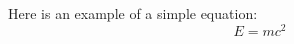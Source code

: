 \documentclass{article}
\begin{document}
Here is an example of a simple equation:
\begin{equation}
    E = mc^2
\end{equation}
\end{document}
